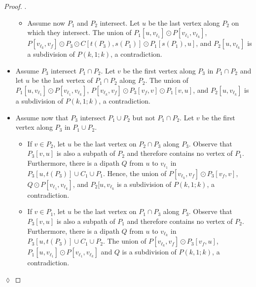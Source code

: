 \documentclass[utf8,10pt]{article}
\theoremstyle{plain}
\theoremstyle{definition}
\theoremstyle{remark}
\newenvironment{subproof}{\par\noindent {\it Subproof}.\ }{\hfill$\lozenge$\par\vspace{11pt}}
\begin{document}
\begin{proof}
\begin{subproof}
\begin{itemize}
\begin{itemize}
		\item Assume now $P_1$ and $P_2$ intersect. Let $u$ be the last vertex along $P_2$ on which they intersect. The union of $P_1[u,v_{\ell_1}]\odot P[v_{\ell_1}, v_{\ell_k}]$, $P[v_{\ell_k}, v_f]\odot P_3\odot C[t(P_3), s(P_1)]\odot P_1[s(P_1), u]$, and $P_2[u, v_{\ell_k}]$ is a subdivision of $P(k,1;k)$, a contradiction.
	\end{itemize}

	\item Assume $P_3$ intersect $P_1\cap P_2$. Let $v$ be the first vertex along $P_3$ in $P_1\cap P_2$ and let $u$ be the last vertex of $P_1\cap P_2$ along $P_2$. The union of $P_1[u,v_{\ell_1}]\odot P[v_{\ell_1}, v_{\ell_k}]$, $P[v_{\ell_k}, v_f]\odot P_3[v_f,v]\odot P_1[v, u]$, and $P_2[u, v_{\ell_k}]$ is a subdivision of $P(k,1;k)$, a contradiction.

	\item Assume now that $P_3$ intersect $P_1\cup P_2$ but not $P_1\cap P_2$. Let $v$ be the first vertex along $P_3$ in $P_1\cup P_2$.
	\begin{itemize}
	\item If $v \in P_2$, let $u$ be the last vertex on $P_2\cap P_3$ along $P_3$. Observe that $P_3[v,u]$ is also a subpath of $P_2$ and therefore contains no vertex of $P_1$. Furthermore, there is a dipath $Q$ from $u$ to $v_{\ell_1}$ in $P_3[u, t(P_3)]\cup C_1\cup  P_1$. Hence, the union of $P[v_{\ell_k}, v_f] \odot P_3[v_f,v]$, $Q\odot P[v_{\ell_1},v_{\ell_k}]$, and $P_2[u,v_{\ell_k}$ is a subdivision of $P(k,1;k)$, a contradiction.
	
	\item If $v\in P_1$, let $u$ be the last vertex on $P_1\cap P_3$ along $P_3$.  Observe that $P_3[v,u]$ is also a subpath of $P_1$ and therefore contains no vertex of $P_2$. Furthermore, there is a dipath $Q$ from $u$ to $v_{\ell_k}$ in $P_3[u, t(P_3)]\cup C_1\cup  P_2$.
	The union of $P[v_{\ell_k}, v_f] \odot P_3[v_f,u]$, $P_1[u, v_{\ell_1}]\odot P[v_{\ell_1}, v_{\ell_k}]$ and $Q$ is a subdivision of $P(k,1;k)$, a contradiction.

	\end{itemize}

\end{itemize}
\end{subproof}
\end{proof}
\end{document}
